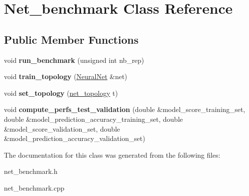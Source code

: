 \hypertarget{classNet__benchmark}{\section{Net\-\_\-benchmark Class Reference}
\label{classNet__benchmark}
}
\subsection*{Public Member Functions}
\begin{DoxyCompactItemize}
\item 
\hypertarget{classNet__benchmark_ad82d3a4ec7f72525398b912e6f2adb6f}{void {\bfseries run\-\_\-benchmark} (unsigned int nb\-\_\-rep)}\label{classNet__benchmark_ad82d3a4ec7f72525398b912e6f2adb6f}

\item 
\hypertarget{classNet__benchmark_aa1416831a6e196d4297fcc8d3261c790}{void {\bfseries train\-\_\-topology} (\hyperlink{classNeuralNet}{Neural\-Net} \&net)}\label{classNet__benchmark_aa1416831a6e196d4297fcc8d3261c790}

\item 
\hypertarget{classNet__benchmark_a5ad4944768cd84b18c97e33950fa6ee7}{void {\bfseries set\-\_\-topology} (\hyperlink{structnet__topology}{net\-\_\-topology} t)}\label{classNet__benchmark_a5ad4944768cd84b18c97e33950fa6ee7}

\item 
\hypertarget{classNet__benchmark_a39cebf7409dc8665b3a11a2c3bf79076}{void {\bfseries compute\-\_\-perfs\-\_\-test\-\_\-validation} (double \&model\-\_\-score\-\_\-training\-\_\-set, double \&model\-\_\-prediction\-\_\-accuracy\-\_\-training\-\_\-set, double \&model\-\_\-score\-\_\-validation\-\_\-set, double \&model\-\_\-prediction\-\_\-accuracy\-\_\-validation\-\_\-set)}\label{classNet__benchmark_a39cebf7409dc8665b3a11a2c3bf79076}

\end{DoxyCompactItemize}


The documentation for this class was generated from the following files\-:\begin{DoxyCompactItemize}
\item 
net\-\_\-benchmark.\-h\item 
net\-\_\-benchmark.\-cpp\end{DoxyCompactItemize}
